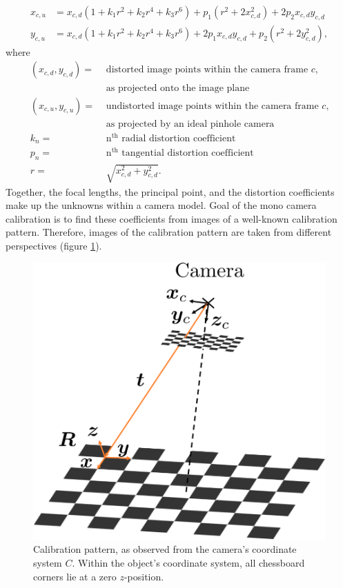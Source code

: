 \begin{align}
	x_{c,u} &= x_{c,d}(1+k_1r^2+k_2r^4+k_3r^6) + p_1(r^2+2x_{c,d}^2) + 2p_2x_{c,d}y_{c,d} 
	\label{eq::32_x_dist}\\
	y_{c,u} &= x_{c,d}(1+k_1r^2+k_2r^4+k_3r^6) + 2p_1x_{c,d}y_{c,d} + p_2(r^2+2y_{c,d}^2),
	\label{eq::32_y_dist}
\end{align}
where
\begin{align}
	(x_{c,d}, y_{c,d}) = &\,\,\text{distorted image points within the camera frame $c$,} 
	\nonumber\\
		                 &\,\,\text{as projected onto the image plane}
	\nonumber\\ 
	(x_{c,u}, y_{c,u}) = &\,\,\text{undistorted image points within the camera frame $c$,}
	\nonumber\\
	                     &\,\,\text{as projected by an ideal pinhole camera}
	\nonumber\\
	k_n = &\,\,\text{n$^\text{th}$ radial distortion coefficient}
	\nonumber\\
	p_n = &\,\,\text{n$^\text{th}$ tangential distortion coefficient}
	\nonumber\\
	r = &\,\,\sqrt{x_{c,d}^2+y_{c,d}^2}.
	\nonumber
\end{align}
Together, the focal lengths, the principal point, and the distortion coefficients make up the unknowns within a camera model. Goal of the mono camera calibration is to find these coefficients from images of a well-known calibration pattern. Therefore, images of the calibration pattern are taken from different perspectives (figure \ref{fig::32_calibration_process}). 
\begin{figure}[h!]
	\centering
	\includegraphics[scale=.28]{chapters/03_fundamentals_of_image_processing/img/calibration_process.png}
	\caption{Calibration pattern, as observed from the camera's coordinate system $C$. Within the object's coordinate system, all chessboard corners lie at a zero $z$-position.}
	\label{fig::32_calibration_process}
\end{figure}
